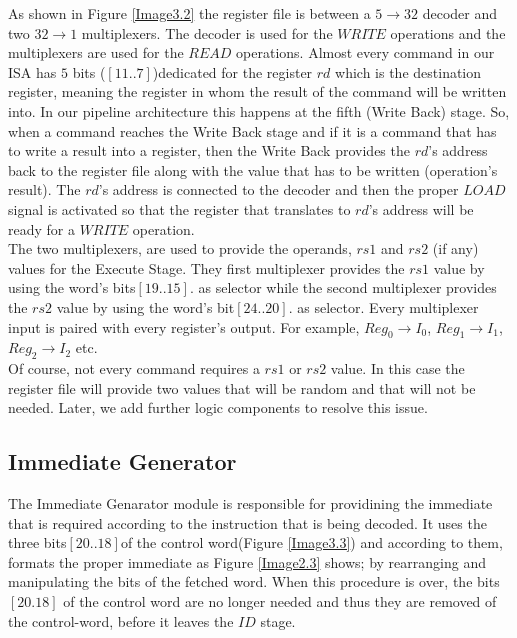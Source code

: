 	As shown in Figure \ref{Image3.2} the register file is between a $5\rightarrow32$ decoder and two $32\rightarrow1$ multiplexers.
	The decoder is used for the $WRITE$ operations and the multiplexers are used for the $READ$ operations. Almost every command in our ISA has $5$ bits ($[11..7]$)\footnotemark dedicated for the register $rd$ which is the destination register, meaning the register in whom the result of the command will be written into. In our pipeline architecture this happens at the fifth (Write Back) stage. So, when a command reaches the Write Back stage and if it is a command that has to write a result into a register, then the Write Back provides the $rd$'s address back to the register file along with the value that has to be written (operation's result). The $rd$'s address is connected to the decoder and then the proper $LOAD$ signal is activated so that the register that translates to $rd$'s address will be ready for a $WRITE$ operation.\\
	
	The two multiplexers, are used to provide the operands, $rs1$ and $rs2$ (if any) values for the Execute Stage. They first multiplexer provides the $rs1$ value by using the word's bits$[19..15]$\footnotemark[\value{footnote}]. as selector while the second multiplexer provides the $rs2$ value by using the word's bit$[24..20]$\footnotemark[\value{footnote}]. as selector. Every multiplexer input is paired with every register's output. For example, $Reg_0\rightarrow I_0$, $Reg_1 \rightarrow I_1$, $Reg_2 \rightarrow I_2$ etc. \\
	
	Of course, not every command requires a $rs1$ or $rs2$ value. In this case the register file will provide two values that will be random and that will not be needed. Later, we add further logic components to resolve this issue. 
	
	
\subsection{\textcolor{burgundy}{Immediate Generator}}
\label{subsection3.3}
The Immediate Genarator module is responsible for providining the immediate that is required according to the instruction that is being decoded. It uses the three bits$[20..18]$of the control word(Figure \ref{Image3.3})  and according to them, formats the proper immediate as Figure \ref{Image2.3} shows; by rearranging and manipulating the bits of the fetched word. When this procedure is over, the bits$[20.18]$ of the control word are no longer needed and thus they are removed of the control-word, before it leaves the $ID$ stage. \\

